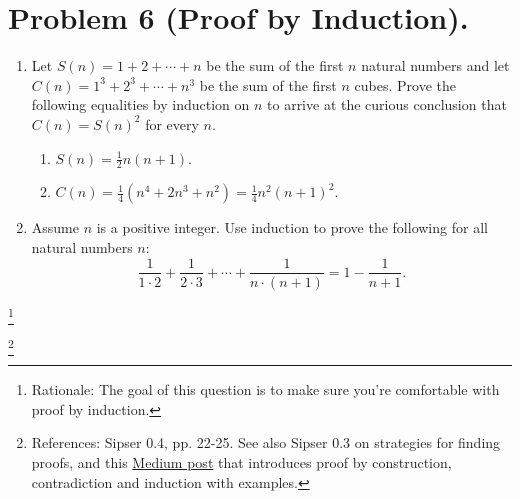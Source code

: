 \documentclass[letterpaper,11pt,twoside]{article}
\theoremstyle{plain}
\theoremstyle{definition}
\theoremstyle{remark}
\theoremstyle{restate}
\newcommand\blfootnote[1]{%
  \begingroup
  \renewcommand\thefootnote{}\footnote{#1}%
  \addtocounter{footnote}{-1}%
  \endgroup
}
\begin{document}
\clearpage
\section{Problem 6 (Proof by Induction).}
\begin{enumerate}
    \item Let $S(n) = 1 + 2 + \cdots + n$ be the sum of the first $n$ natural numbers and let $C(n) = 1^3 + 2^3 + \cdots + n^3$ be the sum of the first $n$ cubes. Prove the following equalities by induction on $n$ to arrive at the curious conclusion that $C(n) = S(n)^2$ for every $n$.
    \begin{enumerate}
        \item $S(n) = \frac{1}{2} n (n+1)$.

        \item $C(n) = \frac{1}{4}(n^4 + 2n^3 + n^2) = \frac{1}{4}n^2(n+1)^2$.

    \end{enumerate} 
    \item Assume $n$ is a positive integer. Use induction to prove the following for all natural numbers $n$: 
    \[
        \frac{1}{1\cdot2} +  \frac{1}{2\cdot3} + \cdots +  \frac{1}{n\cdot(n+1)} = 1 - \frac{1}{n+1}.
    \]

\end{enumerate}

\blfootnote{ Rationale: The goal of this question is to make sure you're comfortable with proof by induction. }
\blfootnote{ References: Sipser 0.4, pp. 22-25. See also Sipser 0.3 on strategies for finding proofs, and this \href{https://medium.com/@nissim.lavy/types-of-proofs-c43ffacc8ada}{Medium post} that introduces proof by construction, contradiction and induction with examples. }
\end{document}
